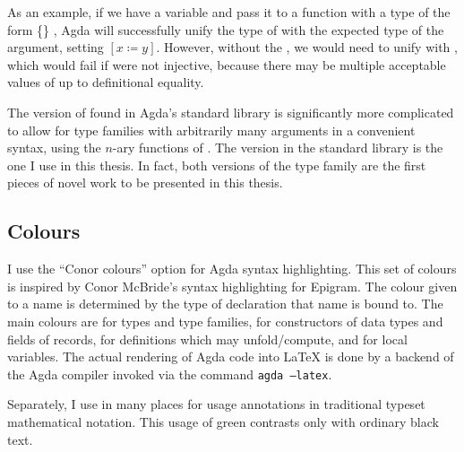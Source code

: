 
As an example, if we have a variable
\AgdaSpace{}\AgdaSymbol{:}\AgdaSpace{}%
\AgdaSpace{}\AgdaSpace{}
and pass it to a function with a type of the form
\AgdaSymbol{$\forall$}\AgdaSpace{}\AgdaSymbol\{\AgdaSymbol\}%
\AgdaSpace{}\AgdaSymbol{$\to$}\AgdaSpace{}\AgdaSpace{}%
\AgdaSpace{}\AgdaSpace{}\AgdaSymbol{$\to$}%
\AgdaSpace{}\AgdaSymbol{\_},
Agda will successfully unify the type of  with the expected type of
the argument, setting $[x \coloneqq y]$.
However, without the , we would need to unify
\AgdaSpace{} with
\AgdaSpace{}, which would fail if 
were not injective, because there may be multiple acceptable values of
 up to definitional equality.

The version of  found in Agda's standard library is
significantly more complicated to allow for type families with arbitrarily many
arguments in a convenient syntax, using the $n$-ary functions of
\citet{Allais19}.
The version in the standard library is the one I use in this thesis.
In fact, both versions of the  type family are the first pieces
of novel work to be presented in this thesis.

\subsection{Colours}

I use the ``Conor colours'' option for Agda syntax highlighting.
This set of colours is inspired by Conor McBride's syntax highlighting for
Epigram.
The colour given to a name is determined by the type of declaration that name
is bound to.
The main colours are  for types and type families,
 for constructors of data types and fields of records,
 for definitions which may unfold/compute, and
 for local variables.
The actual rendering of Agda code into \LaTeX{} is done by a backend of the Agda
compiler invoked via the command \texttt{agda --latex}.

Separately, I use  in many places for usage annotations in traditional
typeset mathematical notation.
This usage of green contrasts only with ordinary black text.
